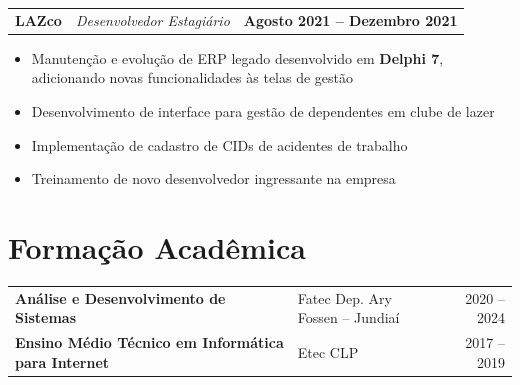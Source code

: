 \documentclass[a4paper,11pt]{article}
\makeatletter
\newenvironment{joblong}[3]
    {
    \begin{tabularx}{\linewidth}{@{}l X r@{}}
    \textbf{\color{darkblue}#1} & \hfill \textit{\small\color{medgray}#3} & \textbf{\small #2} \\[2pt]
    \end{tabularx}
    \begin{minipage}[t]{\linewidth}
    \begin{itemize}[nosep,after=\strut, leftmargin=1.2em, itemsep=3pt,label={\small\color{darkblue}$\bullet$}]
    }
    {
    \end{itemize}
    \end{minipage}
    \vspace{4pt}
    }
\makeatother
\begin{document}
\begin{joblong}{LAZco}{Agosto 2021 -- Dezembro 2021}{Desenvolvedor Estagiário}
\item Manutenção e evolução de ERP legado desenvolvido em \textbf{Delphi 7}, adicionando novas funcionalidades às telas de gestão
\item Desenvolvimento de interface para gestão de dependentes em clube de lazer
\item Implementação de cadastro de CIDs de acidentes de trabalho
\item Treinamento de novo desenvolvedor ingressante na empresa
\end{joblong}

%
%

\section{Formação Acadêmica}

\begin{tabularx}{\linewidth}{@{}l X r@{}}
\textbf{Análise e Desenvolvimento de Sistemas} & \small Fatec Dep. Ary Fossen -- Jundiaí & 2020 -- 2024 \\[3pt]
\textbf{Ensino Médio Técnico em Informática para Internet} & \small Etec CLP & 2017 -- 2019 \\
\end{tabularx}
\end{document}
